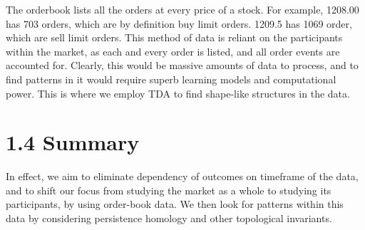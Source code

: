 \documentclass[14pt]{extarticle}
\begin{document}
The orderbook lists all the orders at every price of a stock. For example, 1208.00 has 703 orders, which are by definition buy limit orders. 1209.5 has 1069 order, which are sell limit orders. This method of data is reliant on the participants within the market, as each and every order is listed, and all order events are accounted for. Clearly, this would be massive amounts of data to process, and to find patterns in it would require superb learning models and computational power. This is where we employ TDA to find shape-like structures in the data.\\


\section*{1.4 Summary}

In effect, we aim to eliminate dependency of outcomes on timeframe of the data, and to shift our focus from studying the market as a whole to studying its participants, by using order-book data. We then look for patterns within this data by considering persistence homology and other topological invariants.
\end{document}
